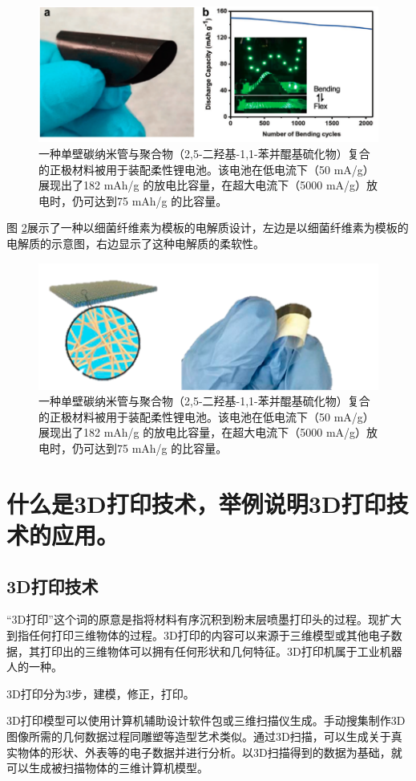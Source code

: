 \documentclass[UTF8,9pt]{ctexart}
\newcommand\se{\section}                                               %
\newcommand\sub{\subsection}                                           %
\begin{document}
\begin{figure}[htbp]
    \centering
    \includegraphics[scale=0.5]{17.png}
    \caption{一种单壁碳纳米管与聚合物（2,5-二羟基-1,1-苯并醌基硫化物）复合的正极材料被用于装配柔性锂电池。该电池在低电流下（50 mA/g）展现出了182 mAh/g 的放电比容量，在超大电流下（5000 mA/g）放电时，仍可达到75 mAh/g 的比容量。}
    \label{ldc2}
\end{figure}

图 \ref{ldc3}展示了一种以细菌纤维素为模板的电解质设计，左边是以细菌纤维素为模板的电解质的示意图，右边显示了这种电解质的柔软性。

\begin{figure}[htbp]
    \centering
    \includegraphics[scale=0.5]{18.png}
    \caption{一种单壁碳纳米管与聚合物（2,5-二羟基-1,1-苯并醌基硫化物）复合的正极材料被用于装配柔性锂电池。该电池在低电流下（50 mA/g）展现出了182 mAh/g 的放电比容量，在超大电流下（5000 mA/g）放电时，仍可达到75 mAh/g 的比容量。}
    \label{ldc3}
\end{figure}

\se{什么是3D打印技术，举例说明3D打印技术的应用。}
\sub{3D打印技术}
“3D打印”这个词的原意是指将材料有序沉积到粉末层喷墨打印头的过程。现扩大到指任何打印三维物体的过程。3D打印的内容可以来源于三维模型或其他电子数据，其打印出的三维物体可以拥有任何形状和几何特征。3D打印机属于工业机器人的一种。

3D打印分为3步，建模，修正，打印。

3D打印模型可以使用计算机辅助设计软件包或三维扫描仪生成。手动搜集制作3D图像所需的几何数据过程同雕塑等造型艺术类似。通过3D扫描，可以生成关于真实物体的形状、外表等的电子数据并进行分析。以3D扫描得到的数据为基础，就可以生成被扫描物体的三维计算机模型。
\end{document}
